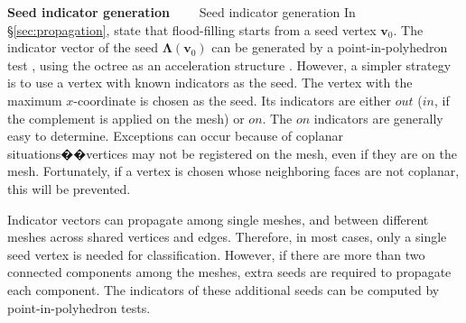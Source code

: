 \vspace{0.5em}
\noindent\textbf{Seed indicator generation}~~~~%
Seed indicator generation In \S\ref{sec:propagation}, state that flood-filling starts from a seed vertex $\bm{v}_0$. The indicator vector of the seed $\bm{\Lambda}(\bm{v}_0)$ can be generated by a point-in-polyhedron test \cite{ogayar2005point}, using the octree as an acceleration structure \cite{frisken2002simple}. However, a simpler strategy is to use a vertex with known indicators as the seed. The vertex with the maximum $x$-coordinate is chosen as the seed. Its indicators are either $out$ ($in$, if the complement is applied on the mesh) or $on$. The $on$ indicators are generally easy to determine. Exceptions can occur because of coplanar situations��vertices may not be registered on the mesh, even if they are on the mesh. Fortunately, if a vertex is chosen whose neighboring faces are not coplanar, this will be prevented.

\vspace{0.5em} %
Indicator vectors can propagate among single meshes, and between different meshes across shared vertices and edges. Therefore, in most cases, only a single seed vertex is needed for classification. However, if there are more than two connected components among the meshes, extra seeds are required to propagate each component. The indicators of these additional seeds can be computed by point-in-polyhedron tests.

